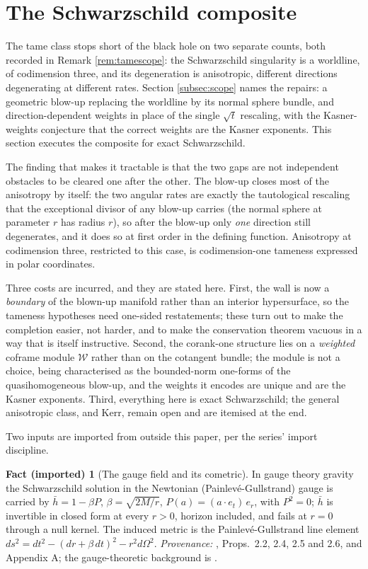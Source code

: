 \documentclass[11pt]{article}
\theoremstyle{definition}
\newtheorem{fact}[theorem]{Fact (imported)}
\newcommand{\shW}{\mathcal{W}}
\newcommand{\hb}{\bar{h}}
\begin{document}
\section{The Schwarzschild composite}\label{sec:schwarzschild}

The tame class stops short of the black hole on two separate counts, both recorded in Remark \ref{rem:tamescope}: the Schwarzschild singularity is a worldline, of codimension three, and its degeneration is anisotropic, different directions degenerating at different rates. Section \ref{subsec:scope} names the repairs: a geometric blow-up replacing the worldline by its normal sphere bundle, and direction-dependent weights in place of the single $\sqrt t$ rescaling, with the Kasner-weights conjecture that the correct weights are the Kasner exponents. This section executes the composite for exact Schwarzschild.

The finding that makes it tractable is that the two gaps are not independent obstacles to be cleared one after the other. The blow-up closes most of the anisotropy by itself: the two angular rates are exactly the tautological rescaling that the exceptional divisor of any blow-up carries (the normal sphere at parameter $r$ has radius $r$), so after the blow-up only \emph{one} direction still degenerates, and it does so at first order in the defining function. Anisotropy at codimension three, restricted to this case, is codimension-one tameness expressed in polar coordinates.

Three costs are incurred, and they are stated here. First, the wall is now a \emph{boundary} of the blown-up manifold rather than an interior hypersurface, so the tameness hypotheses need one-sided restatements; these turn out to make the completion easier, not harder, and to make the conservation theorem vacuous in a way that is itself instructive. Second, the corank-one structure lies on a \emph{weighted} coframe module $\shW$ rather than on the cotangent bundle; the module is not a choice, being characterised as the bounded-norm one-forms of the quasihomogeneous blow-up, and the weights it encodes are unique and are the Kasner exponents. Third, everything here is exact Schwarzschild; the general anisotropic class, and Kerr, remain open and are itemised at the end.

Two inputs are imported from outside this paper, per the series' import discipline.

\begin{fact}[The gauge field and its cometric]\label{fact:pg}
In gauge theory gravity the Schwarzschild solution in the Newtonian (Painlev\'e-Gullstrand) gauge is carried by $\hb = 1 - \beta P$, $\beta = \sqrt{2M/r}$, $P(a) = (a \cdot e_t)\,e_r$, with $P^2 = 0$; $\hb$ is invertible in closed form at every $r > 0$, horizon included, and fails at $r = 0$ through a null kernel. The induced metric is the Painlev\'e-Gullstrand line element $ds^2 = dt^2 - (dr + \beta\,dt)^2 - r^2 d\Omega^2$. \emph{Provenance:} \cite{ButlerT5}, Props.~2.2, 2.4, 2.5 and 2.6, and Appendix A; the gauge-theoretic background is \cite{DoranLasenby2003}.
\end{fact}
\end{document}
